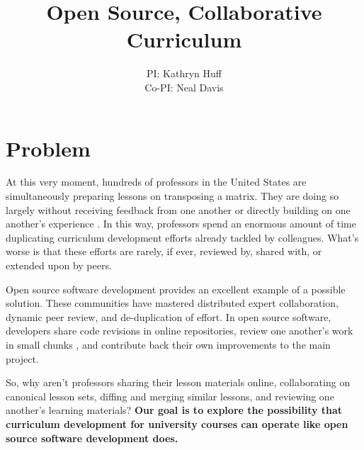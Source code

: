 \documentclass[11pt]{article}
\makeatletter
\newcommand{\authorname}{Kathryn~D.~Huff }
\newcommand{\authoremail}{kdhuff@illinois.edu}
\newcommand{\authorsite}{arfc.npre.illinois.edu}
\makeatother
\begin{document}
          \title{Open Source, Collaborative Curriculum}
          \author{PI: Kathryn Huff\\Co-PI: Neal Davis}
          \maketitle

          \pagestyle{fancy}
          \lhead{\textcolor{gray}{PI: \authorname (NPRE)\\\authoremail}}
          \rhead{\textcolor{gray}{Collaborative Open Source Curriculum Development\\}}
          \renewcommand{\headrulewidth}{0pt}
          \renewcommand{\footrulewidth}{0pt}

          \section{Problem}
          At this very moment, hundreds of professors in the United States are 
          simultaneously preparing lessons on transposing a matrix.
          They are doing so largely without receiving feedback from one another 
          or directly building on one another's experience 
          \cite{green_building_2014}. In this way, 
          professors spend an enormous amount of time duplicating curriculum 
          development efforts already tackled by colleagues. What's worse is 
          that these efforts are rarely, if ever, reviewed by, shared with, or 
          extended upon by peers.
          
          Open source software development provides an excellent 
          example of a possible solution.
          These communities have mastered distributed expert collaboration, 
          dynamic peer review, and de-duplication of effort. In open source 
          software, developers share code revisions in online repositories, 
          review one another's work in small chunks \cite{wilson_best_2014}, 
          and contribute back their own improvements to the main project.

          So, why aren't professors sharing their lesson materials online, 
          collaborating on canonical lesson sets, diffing and merging similar 
          lessons, and reviewing one another's learning materials? \textbf{Our 
          goal is to explore the possibility that curriculum development for 
          university courses can operate like open source software development 
          does.}
           
\end{document}
